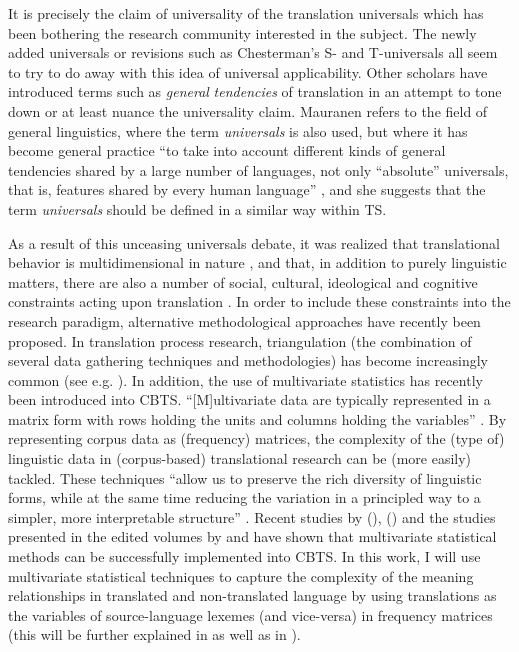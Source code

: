 It is precisely the claim of universality of the translation universals which has been bothering the research community interested in the subject. The newly added universals or revisions such as Chesterman’s S- and T-universals all seem to try to do away with this idea of universal applicability. Other scholars have introduced terms such as \textit{general} \textit{tendencies} of translation in an attempt to tone down or at least nuance the universality claim. Mauranen refers to the field of general linguistics, where the term \textit{universals} is also used, but where it has become general practice “to take into account different kinds of general tendencies shared by a large number of languages, not only ``absolute'' universals, that is, features shared by every human language” \citep[35]{anderman_universal_2008}, and she suggests that the term \textit{universals} should be defined in a similar way within TS.

As a result of this unceasing universals debate, it was realized that translational behavior is multidimensional in nature \citep{de_sutter_inevitability_2013}, and that, in addition to purely linguistic matters, there are also a number of social, cultural, ideological and cognitive constraints acting upon translation \citep{baker_role_1999}. In order to include these constraints into the research paradigm, alternative methodological approaches have recently been proposed. In translation process research, triangulation (the combination of several data gathering techniques and methodologies) has become increasingly common (see e.g. \citealt{alves_foreword._2003,carl_triangulating_2010,shreve_integrative_2010}). In addition, the use of multivariate statistics has recently been introduced into CBTS. “[M]ultivariate data are typically represented in a matrix form with rows holding the units and columns holding the variables” \citep[302]{meng_multivariate_2012}. By representing corpus data as (frequency) matrices, the complexity of the (type of) linguistic data in (corpus-based) translational research can be (more easily) tackled. These techniques “allow us to preserve the rich diversity of linguistic forms, while at the same time reducing the variation in a principled way to a simpler, more interpretable structure” \citep[301]{meng_multivariate_2012}. Recent studies by  \citeauthor{DelaereEtAl2012} (\citeyear*{DelaereEtAl2012}), \citeauthor{szmrecsanyi_weakly_2014} (\citeyear*{szmrecsanyi_weakly_2014}) and the studies presented in the edited volumes by \citet{oakes_quantitative_2012} and \citet{DeSutterEtAl2017} have shown that multivariate statistical methods can be successfully implemented into CBTS. In this work, I will use multivariate statistical techniques to capture the complexity of the meaning relationships in translated and non-translated language by using translations as the variables of source-language lexemes (and vice-versa) in frequency matrices (this will be further explained in  as well as in ).

